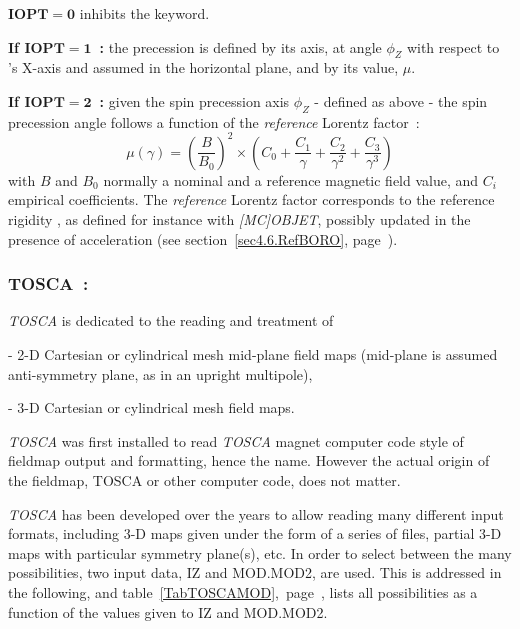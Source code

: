 {\bigskip

\noindent \textbf{$\mathbf{IOPT  =  0}$} inhibits the keyword. 

\bigskip

\noindent \textbf{If $\mathbf{IOPT  =  1}$~:} the precession is defined by its axis, at angle  $\phi_Z$ with 
respect to \zgou's X-axis and assumed in the horizontal plane,  and by its value, $\mu$. 

\bigskip

\noindent \textbf{If $\mathbf{IOPT  =  2}$~:}  given the spin precession axis $\phi_Z$ - defined as  above -  
   the spin precession angle follows a function of the \textsl{reference} Lorentz factor~: 
  $$\mu (\gamma) = \left(\frac{B}{B_0}\right)^2 \times \left( C_0 + \frac{C_1}{\gamma} + \frac{C_2}{\gamma^2}  + \frac{C_3}{\gamma^3} \right) $$
 with $B$ and $B_0$ normally  a nominal and a reference magnetic field value, and $C_i$ empirical coefficients. 
The \textsl{reference} Lorentz factor corresponds to the reference rigidity 
 \BORO, as defined for instance with \textsl{[MC]OBJET}, possibly updated in the presence of acceleration 
(see section~\ref{sec4.6.RefBORO}, page~\pageref{sec4.6.RefBORO}). 

\newpage

\subsubsection*{TOSCA~: \TOSCATitl} \label{TOSCA} 
\medskip

 \textsl{TOSCA} is dedicated to the reading and treatment of 

- 2-D  Cartesian or cylindrical mesh mid-plane field maps (mid-plane is assumed anti-symmetry plane, as in an upright multipole), 

- 3-D Cartesian or cylindrical mesh field maps.  

\medskip

\noindent  \textsl{TOSCA}  was first installed to read \textsl{TOSCA}  magnet computer code style of fieldmap  output and  formatting, hence the name. However the actual origin of the fieldmap, TOSCA or other computer code, does not matter. 

\medskip

\noindent  \textsl{TOSCA} has been developed over the years to allow reading  many different input formats, 
including 3-D maps given under the form of a series of files, partial 3-D maps with particular symmetry plane(s), etc.
In order to select between the many possibilities, two input data, IZ and MOD.MOD2, are used. This is addressed in the following, 
and table~\ref{TabTOSCAMOD},~page~\pageref{TabTOSCAMOD}, lists all possibilities as a function of the values 
given to IZ and MOD.MOD2. 

}

